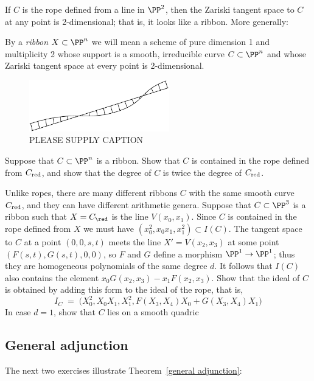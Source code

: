 If $C$ is the rope defined from a line in $\PP^2$, then the Zariski tangent space to $C$ at
any point is 2-dimensional; that is, it looks like a ribbon. More generally:

\begin{definition}
By a \emph{ribbon} $X \subset \PP^n$ we will mean a scheme of pure dimension 1 and multiplicity 2 whose support is a smooth, irreducible curve $C \subset \PP^n$ and whose Zariski tangent space at every point is 2-dimensional.
\end{definition}


\begin{figure}
\centerline {\includegraphics[width=2.4in]{"main/Fig15-3"}}
\caption{\color{red}PLEASE SUPPLY CAPTION}
\label{Fig15.3}
\end{figure}

\begin{exercise}
Suppose that $C\subset \PP^n$ is a ribbon. Show that $C$ is contained in the rope defined
from $C_{\rm red}$, and show that the degree of $C$ is twice the degree of $C_{\rm red}$.
\end{exercise}

Unlike ropes, there are many different ribbons $C$ with the same smooth curve $C_{\rm red}$,
and they can have different arithmetic genera. 
Suppose that $C\subset \PP^3$ is a ribbon such that $X = C_{\red}$ is the line $V(x_0,x_1)$.
Since $C$ is contained in the rope defined from $X$ we must have $(x_0^2, x_0x_1,x_1^2) \subset I(C)$. The tangent space to $C$ at a point $(0,0,s,t)$ meets the line  $X' = V(x_2, x_3)$
at some point $(F(s,t),G(s,t),0,0)$, so $F$ and $G$ define a morphism $\PP^1 \to \PP^1$;
thus they are homogeneous polynomials of the same degree $d$.  It follows that $I(C)$ also contains the element
$x_0 G(x_2, x_3) - x_1F(x_2,x_3)$. Show that the ideal of $C$ is obtained by adding this form to the ideal of the rope, that is,
$$
I_C \; = \; \big(X_0^2, X_0X_1, X_1^2, F(X_3,X_4)X_0 + G(X_3,X_4)X_1\big)
$$
In case $d=1$, show that $C$ lies on a smooth quadric 
\subsection{General adjunction}

The next two exercises illustrate Theorem~\ref{general adjunction}:

